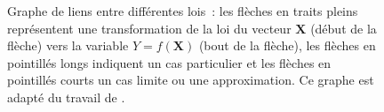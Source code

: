 \documentclass[10pt]{article}
\newcommand{\bX}{\mathbf{X}}
\begin{document}
\begin{figure}[!ht]
\begin{center}
\begin{tikzpicture}
\end{tikzpicture}
\caption{\label{Fig:GrapheLoi}Graphe de liens entre différentes lois~: les flèches en traits pleins représentent une transformation de la loi du vecteur $\bX$ (début de la flèche) vers la variable $Y=f(\bX)$ (bout de la flèche), les flèches en pointillés longs indiquent un cas particulier et les flèches en pointillés courts un cas limite ou une approximation. Ce graphe est adapté du travail de \cite{leemis1986relationships}.}
\end{center}
\end{figure}




\end{document}
